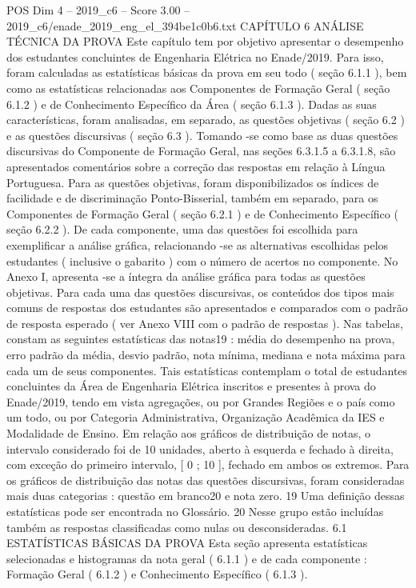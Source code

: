 \begin{textsample}{POS Dim 4 – 2019\_c6 – Score 3.00 – 2019\_c6/enade\_2019\_eng\_el\_394be1c0b6.txt}  \label{ex:f4_pos_097}
CAPÍTULO 6 ANÁLISE TÉCNICA DA PROVA Este capítulo tem por objetivo apresentar o desempenho dos estudantes concluintes de Engenharia Elétrica no Enade/2019.
Para isso, foram calculadas as estatísticas básicas da prova em seu todo ( seção 6.1.1 ), bem como as estatísticas relacionadas aos Componentes de Formação Geral ( seção 6.1.2 ) e de Conhecimento Específico da Área ( seção 6.1.3 ).
Dadas as suas características, foram analisadas, em separado, as questões objetivas ( seção 6.2 ) e as questões discursivas ( seção 6.3 ).
Tomando -se como base as duas questões discursivas do Componente de Formação Geral, nas seções 6.3.1.5 a 6.3.1.8, são apresentados comentários sobre a correção das respostas em relação à Língua Portuguesa.
Para as questões objetivas, foram disponibilizados os índices de facilidade e de discriminação Ponto-Bisserial, também em separado, para os Componentes de Formação Geral ( seção 6.2.1 ) e de Conhecimento Específico ( seção 6.2.2 ).
De cada componente, uma das questões foi escolhida para exemplificar a análise gráfica, relacionando -se as alternativas escolhidas pelos estudantes ( inclusive o gabarito ) com o número de acertos no componente.
No Anexo I, apresenta -se a íntegra da análise gráfica para todas as questões objetivas.
Para cada uma das questões discursivas, os conteúdos dos tipos mais comuns de respostas dos estudantes são apresentados e comparados com o padrão de resposta esperado ( ver Anexo VIII com o padrão de respostas ).
Nas tabelas, constam as seguintes estatísticas das notas19 : média do desempenho na prova, erro padrão da média, desvio padrão, nota mínima, mediana e nota máxima para cada um de seus componentes.
Tais estatísticas contemplam o total de estudantes concluintes da Área de Engenharia Elétrica inscritos e presentes à prova do Enade/2019, tendo em vista agregações, ou por Grandes Regiões e o país como um todo, ou por Categoria Administrativa, Organização Acadêmica da IES e Modalidade de Ensino.
Em relação aos gráficos de distribuição de notas, o intervalo considerado foi de 10 unidades, aberto à esquerda e fechado à direita, com exceção do primeiro intervalo, [ 0 ; 10 ], fechado em ambos os extremos.
Para os gráficos de distribuição das notas das questões discursivas, foram consideradas mais duas categorias : questão em branco20 e nota zero. 19 Uma definição dessas estatísticas pode ser encontrada no Glossário. 20 Nesse grupo estão incluídas também as respostas classificadas como nulas ou desconsideradas. 6.1 ESTATÍSTICAS BÁSICAS DA PROVA Esta seção apresenta estatísticas selecionadas e histogramas da nota geral ( 6.1.1 ) e de cada componente : Formação Geral ( 6.1.2 ) e Conhecimento Específico ( 6.1.3 ).

\end{textsample}
